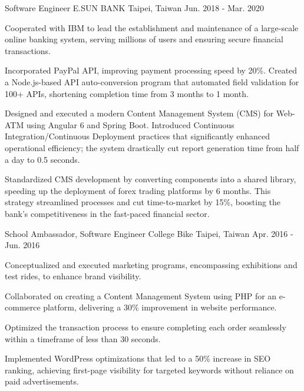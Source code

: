 \begin{cventries}
  \cventry
    {Software Engineer} %
    {E.SUN BANK} %
    {Taipei, Taiwan} %
    {Jun. 2018 - Mar. 2020} %
    {
      \begin{cvitems} %
        \item {Cooperated with IBM to lead the establishment and maintenance of a large-scale online banking system, serving millions of users and ensuring secure financial transactions.}
        \item {Incorporated PayPal API, improving payment processing speed by 20\%. Created a Node.js-based API auto-conversion program that automated field validation for 100+ APIs, shortening completion time from 3 months to 1 month.}
        \item {Designed and executed a modern Content Management System (CMS) for Web-ATM using Angular 6 and Spring Boot. Introduced Continuous Integration/Continuous Deployment practices that significantly enhanced operational efficiency; the system drastically cut report generation time from half a day to 0.5 seconds.}
        \item {Standardized CMS development by converting components into a shared library, speeding up the deployment of forex trading platforms by 6 months. This strategy streamlined processes and cut time-to-market by 15\%, boosting the bank's competitiveness in the fast-paced financial sector.}
      \end{cvitems}
    }

  \cventry
    {School Ambassador, Software Engineer} %
    {College Bike} %
    {Taipei, Taiwan} %
    {Apr. 2016 - Jun. 2016} %
    {
      \begin{cvitems} %
        \item {Conceptualized and executed marketing programs, encompassing exhibitions and test rides, to enhance brand visibility.}
        \item {Collaborated on creating a Content Management System using PHP for an e-commerce platform, delivering a 30\% improvement in website performance.}
        \item {Optimized the transaction process to ensure completing each order seamlessly within a timeframe of less than 30 seconds.}
        \item {Implemented WordPress optimizations that led to a 50\% increase in SEO ranking, achieving first-page visibility for targeted keywords without reliance on paid advertisements.}
      \end{cvitems}
    }


\end{cventries}
